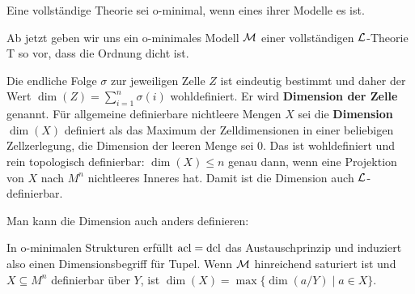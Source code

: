 \begin{definition}
	Eine vollständige Theorie sei o-minimal, wenn eines ihrer Modelle es ist.
\end{definition}

Ab jetzt geben wir uns ein o-minimales Modell $\mathcal{M}$ einer vollständigen $\mathcal{L}$-Theorie T so vor, dass die Ordnung dicht ist.
\begin{lemdef}
	Die endliche Folge $\sigma$ zur jeweiligen Zelle $Z$ ist eindeutig bestimmt und daher der Wert $\dim(Z)=\sum\limits_{i=1}^n\sigma(i)$ wohldefiniert. Er wird \textbf{Dimension der Zelle} genannt. Für allgemeine definierbare nichtleere Mengen $X$ sei die \textbf{Dimension} $\dim(X)$ definiert als das Maximum der Zelldimensionen in einer beliebigen Zellzerlegung, die Dimension der leeren Menge sei 0. Das ist wohldefiniert und rein topologisch definierbar: $\dim(X)\leq n$ genau dann, wenn eine Projektion von $X$ nach $M^n$ nichtleeres Inneres hat. Damit ist die Dimension auch $\mathcal{L}$-definierbar.
\end{lemdef}

Man kann die Dimension auch anders definieren:
\begin{lemma}
	In o-minimalen Strukturen erfüllt $\operatorname{acl}=\operatorname{dcl}$ das Austauschprinzip und induziert also einen Dimensionsbegriff für Tupel. Wenn $\mathcal{M}$ hinreichend saturiert ist und $X\subseteq M^n$ definierbar über $Y$, ist $\dim(X)=\max\{\dim(a/Y)\mid a\in X\}$.
\end{lemma}

